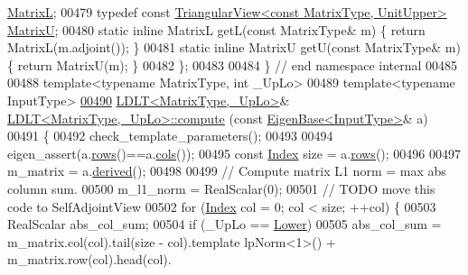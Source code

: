 \begin{DoxyCode}
       \hyperlink{group___core___module_class_eigen_1_1_triangular_view}{MatrixL};
00479   \textcolor{keyword}{typedef} \textcolor{keyword}{const} \hyperlink{group___core___module_class_eigen_1_1_triangular_view}{TriangularView<const MatrixType, UnitUpper>} 
      \hyperlink{group___core___module_class_eigen_1_1_triangular_view}{MatrixU};
00480   \textcolor{keyword}{static} \textcolor{keyword}{inline} MatrixL getL(\textcolor{keyword}{const} MatrixType& m) \{ \textcolor{keywordflow}{return} MatrixL(m.adjoint()); \}
00481   \textcolor{keyword}{static} \textcolor{keyword}{inline} MatrixU getU(\textcolor{keyword}{const} MatrixType& m) \{ \textcolor{keywordflow}{return} MatrixU(m); \}
00482 \};
00483 
00484 \} \textcolor{comment}{// end namespace internal}
00485 
00488 \textcolor{keyword}{template}<\textcolor{keyword}{typename} MatrixType, \textcolor{keywordtype}{int} \_UpLo>
00489 \textcolor{keyword}{template}<\textcolor{keyword}{typename} InputType>
\hyperlink{group___cholesky___module_ad1074d10072cf19437c6428c478fe5d6}{00490} \hyperlink{group___cholesky___module_class_eigen_1_1_l_d_l_t}{LDLT<MatrixType,\_UpLo>}& \hyperlink{group___cholesky___module_class_eigen_1_1_l_d_l_t}{LDLT<MatrixType,\_UpLo>::compute}
      (\textcolor{keyword}{const} \hyperlink{group___core___module_struct_eigen_1_1_eigen_base}{EigenBase<InputType>}& a)
00491 \{
00492   check\_template\_parameters();
00493 
00494   eigen\_assert(a.\hyperlink{group___core___module_a8141320ba8df384426c298b32b000d8e}{rows}()==a.\hyperlink{group___core___module_a7b0b45c7351847696c911ce8aa2abbdb}{cols}());
00495   \textcolor{keyword}{const} \hyperlink{group___cholesky___module_ad9c57eb2fb3bbccd51b9d2e111bea355}{Index} size = a.\hyperlink{group___core___module_a8141320ba8df384426c298b32b000d8e}{rows}();
00496 
00497   m\_matrix = a.\hyperlink{group___core___module_a324b16961a11d2ecfd2d1b7dd7946545}{derived}();
00498 
00499   \textcolor{comment}{// Compute matrix L1 norm = max abs column sum.}
00500   m\_l1\_norm = RealScalar(0);
00501   \textcolor{comment}{// TODO move this code to SelfAdjointView}
00502   \textcolor{keywordflow}{for} (\hyperlink{group___cholesky___module_ad9c57eb2fb3bbccd51b9d2e111bea355}{Index} col = 0; col < size; ++col) \{
00503     RealScalar abs\_col\_sum;
00504     \textcolor{keywordflow}{if} (\_UpLo == \hyperlink{group__enums_gga39e3366ff5554d731e7dc8bb642f83cda891792b8ed394f7607ab16dd716f60e6}{Lower})
00505       abs\_col\_sum = m\_matrix.col(col).tail(size - col).template lpNorm<1>() + m\_matrix.row(col).head(col).

\end{DoxyCode}
